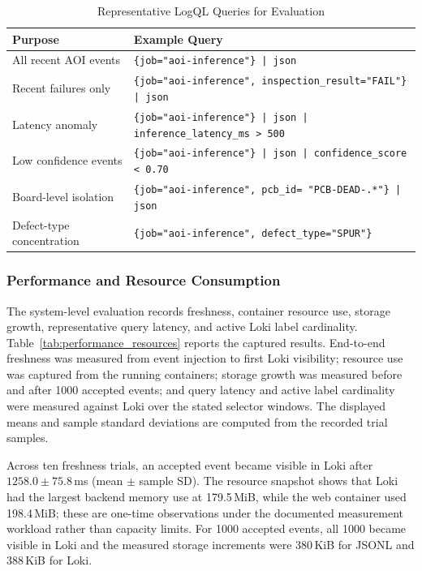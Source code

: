 \documentclass[12pt,a4paper]{article}
\begin{document}
\begin{table}[!ht]
\centering
\caption{Representative LogQL Queries for Evaluation}
\label{tab:logql_queries}
\begin{tabular}{p{} p{}}
\toprule
\textbf{Purpose} & \textbf{Example Query} \\
\midrule
All recent AOI events & \texttt{\{job="aoi-inference"\} | json} \\
Recent failures only & \texttt{\{job="aoi-inference", inspection\_result="FAIL"\} | json} \\
Latency anomaly & \texttt{\{job="aoi-inference"\} | json | inference\_latency\_ms > 500} \\
Low confidence events & \texttt{\{job="aoi-inference"\} | json | confidence\_score < 0.70} \\
Board-level isolation & \texttt{\{job="aoi-inference", pcb\_id=~"PCB-DEAD-.*"\} | json} \\
Defect-type concentration & \texttt{\{job="aoi-inference", defect\_type="SPUR"\}} \\
\bottomrule
\end{tabular}
\end{table}

\subsubsection{Performance and Resource Consumption}\label{subsubsec:perf_resources}
The system-level evaluation records freshness, container resource use, storage
growth, representative query latency, and active Loki label cardinality.
Table~\ref{tab:performance_resources} reports the captured results. End-to-end
freshness was measured from event injection to first Loki visibility; resource
use was captured from the running containers; storage growth was measured
before and after 1000 accepted events; and query latency and active label
cardinality were measured against Loki over the stated selector windows. The
displayed means and sample standard deviations are computed from the recorded
trial samples.

Across ten freshness trials, an accepted event became visible in Loki after
$1258.0 \pm 75.8$\,ms (mean $\pm$ sample SD). The resource snapshot shows
that Loki had the largest backend memory use at 179.5\,MiB, while the web
container used 198.4\,MiB; these are one-time observations under the documented
measurement workload rather than capacity limits. For 1000 accepted events,
all 1000 became visible in Loki and the measured storage increments were
380\,KiB for JSONL and 388\,KiB for Loki.
\end{document}
